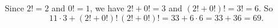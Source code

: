 Since $2!=2$ and $0!=1$, we have $2!+0!=3$ and $(2!+0!)!=3!=6$. So
\[11\cdot3+(2!+0!)!\,(2!+0!)!=33+6\cdot6=33+36=\boxed{69}.\]
